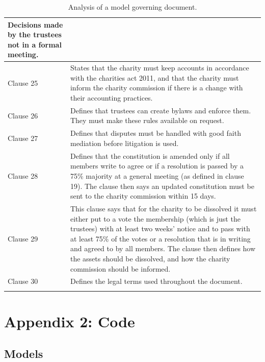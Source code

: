 \documentclass{UoYCSproject}
\begin{document}
\begin{longtable}{|p{}|p{}|}
Decisions made by the trustees not in a formal meeting. \\\hline
  Clause 25 & 
          States that the charity must keep accounts in accordance with the charities act 2011, and that the charity must inform the charity commission if there is a change with their accounting practices. \\\hline
  Clause 26 & 
          Defines that trustees can create bylaws and enforce them. They must make these rules available on request. \\\hline
  Clause 27 & 
          Defines that disputes must be handled with good faith mediation before litigation is used. \\\hline
  Clause 28 & 
          Defines that the constitution is amended only if all members write to agree or if a resolution is passed by a 75\% majority at a general meeting (as defined in clause 19). The clause then says an updated constitution must be sent to the charity commission within 15 days. \\\hline
  Clause 29 & 
          This clause says that for the charity to be dissolved it must either put to a vote the membership (which is just the trustees) with at least two weeks' notice and to pass with at least 75\% of the votes or a resolution that is in writing and agreed to by all members. The clause then defines how the assets should be dissolved, and how the charity commission should be informed. \\\hline
  Clause 30 & 
          Defines the legal terms used throughout the document. \\\hline

\caption{ Analysis of a model governing document. } \\
\end{longtable}

\newpage
\section{Appendix 2: Code}
\label{sec:apendix_code}
\subsection{Models}
\end{document}
